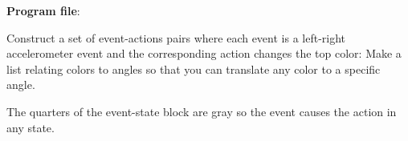 {\raggedleft \hfill \textbf{Program file}: }

Construct a set of event-actions pairs where each event is a left-right
accelerometer event and the corresponding action changes the top color:
Make a list relating colors to angles so that you can translate any
color to a specific angle. 

The quarters of the event-state block are gray so the event causes
the action in any state.

\bigskip


